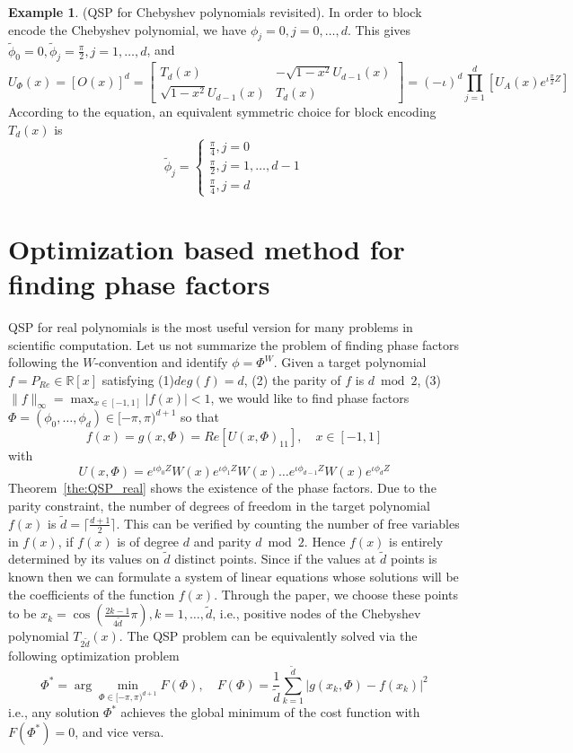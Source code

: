\documentclass[12pt, oneside]{book}
\theoremstyle{definition}
\theoremstyle{definition}
\newtheorem{example}{Example}[section]
\theoremstyle{remark}
\begin{document}
\begin{example}
    (QSP for Chebyshev polynomials revisited). In order to block encode the Chebyshev polynomial, we have $\phi_j=0,j=0,\ldots,d$. This gives $\tilde{\phi}_0=0,\tilde{\phi}_j=\frac{\pi}{2},j=1,\ldots,d$, and
    \[
    U_{\Phi}(x)=[O(x)]^d=\begin{bmatrix}
        T_d(x) & -\sqrt{1-x^2}U_{d-1}(x)\\
        \sqrt{1-x^2}U_{d-1}(x) & T_d(x)
    \end{bmatrix}= (-\iota)^d \prod_{j=1}^d [U_A(x)e^{\iota \frac{\pi}{2}Z}]
    \]
    According to the equation, an equivalent symmetric choice for block encoding $T_d(x)$ is
    \[
    \tilde{\phi}_j =\begin{cases}
        \frac{\pi}{4}, j=0\\
        \frac{\pi}{2}, j=1,\ldots,d-1\\
        \frac{\pi}{4}, j=d
    \end{cases}
    \]
\end{example}
\section{Optimization based method for finding phase factors}
QSP for real polynomials is the most useful version for many problems in scientific computation. Let us not summarize the problem of finding phase factors following the $W$-convention and identify $\phi=\Phi^W$.
Given a target polynomial $f=P_{Re}\in\mathbb{R}[x]$ satisfying (1)$deg(f)=d$, (2) the parity of $f$ is $d\bmod 2$, (3) $\|f\|_{\infty}=\max_{x\in[-1,1]}|f(x)|<1$, we would like to find phase factors $\Phi=(\phi_0,\ldots,\phi_d)\in[-\pi,\pi)^{d+1}$ so that 
\[
f(x)=g(x,\Phi) = Re[U(x,\Phi)_{11}], \quad x\in[-1,1]
\]
with
\[
U(x,\Phi)=e^{\iota \phi_0Z}W(x)e^{\iota \phi_1Z}W(x)\ldots e^{\iota \phi_{d-1}Z}W(x)e^{\iota \phi_dZ}
\]
Theorem~\ref{the:QSP_real} shows the existence of the phase factors. Due to the parity constraint, the number of degrees of freedom in the target polynomial $f(x)$ is $\tilde{d}=\lceil \frac{d+1}{2}\rceil$.  This can be verified by counting the number of free variables in $f(x)$, if $f(x)$ is of degree $d$ and parity $d \bmod 2$. Hence $f(x)$ is entirely determined by its values on $\tilde{d}$ distinct points.  Since if the values at $\tilde{d}$ points is known then we can formulate a system of linear equations whose solutions will be the coefficients of the function $f(x)$. Through the paper, we choose these points to be $x_k=\cos(\frac{2k-1}{4\tilde{d}}\pi), k=1,\ldots,\tilde{d}$, i.e., positive nodes of the Chebyshev polynomial $T_{2\tilde{d}}(x)$. The QSP problem can be equivalently solved via the following optimization problem
\[
\Phi^* = \arg \min_{\Phi\in[-\pi,\pi)^{d+1}} F(\Phi), \quad F(\Phi)=\frac{1}{\tilde{d}}\sum_{k=1}^{\tilde{d}}|g(x_k,\Phi)-f(x_k)|^2
\]
i.e., any solution $\Phi^*$ achieves the global minimum of the cost function with $F(\Phi^*)=0$, and vice versa.
\end{document}
